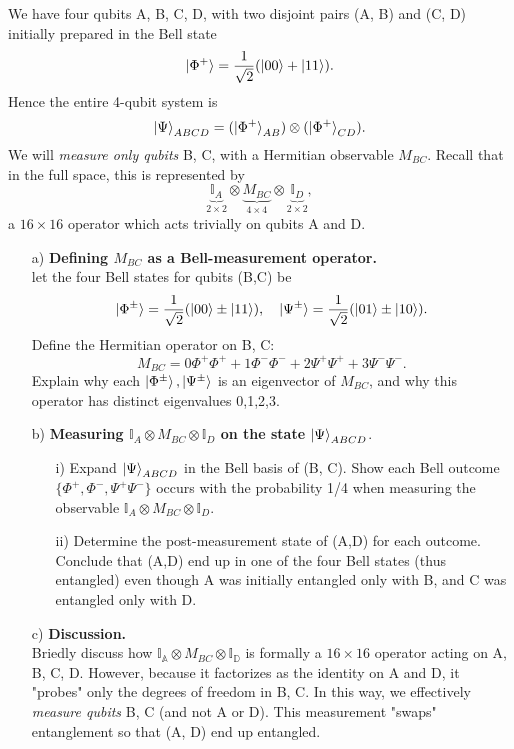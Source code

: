 \documentclass{article}
\begin{document}
\begin{question}
    We have four qubits A, B, C, D, with two disjoint pairs (A, B) and (C, D) initially prepared in the Bell state $$\ket{\Phi^+}=\frac{1}{\sqrt{2}}(\ket{00}+\ket{11}).$$ Hence the entire 4-qubit system is $$\ket{\Psi}_{ABCD}=(\ket{\Phi^+}_{AB})\otimes(\ket{\Phi^+}_{CD}).$$ We will \textit{measure only qubits} B, C, with a Hermitian observable $M_{BC}$. Recall that in the full space, this is represented by $$\underbrace{\mathbb{I}_A}_{2\times 2} \otimes \underbrace{M_{BC}}_{4\times 4} \otimes \underbrace{\mathbb{I}_D}_{2\times 2},$$ a $16\times 16$ operator which acts trivially on qubits A and D.
    \begin{enumerate}
        \item[a)]\textbf{Defining $M_{BC}$ as a Bell-measurement operator.}\\
        let the four Bell states for qubits (B,C) be $$\ket{\Phi^\pm}=\frac{1}{\sqrt{2}}(\ket{00}\pm\ket{11}), \quad \ket{\Psi^\pm}=\frac{1}{\sqrt{2}}(\ket{01}\pm\ket{10}).$$ Define the Hermitian operator on B, C: $$M_{BC}=0\Phi^+\Phi^++1\Phi^-\Phi^-+2\Psi^+\Psi^++3\Psi^-\Psi^-.$$ Explain why each $\ket{\Phi^\pm},\ket{\Psi^\pm}$ is an eigenvector of $M_{BC}$, and why this operator has distinct eigenvalues 0,1,2,3.
        \item[b)]\textbf{Measuring $\mathbb{I}_A \otimes M_{BC} \otimes \mathbb{I}_D$ on the state $\ket{\Psi}_{ABCD}$}.
        \begin{enumerate}
            \item[i)] Expand $\ket{\Psi}_{ABCD}$ in the Bell basis of (B, C). Show each Bell outcome $\{\Phi^+,\Phi^-,\Psi^+\Psi^-\}$ occurs with the probability 1/4 when measuring the observable $\mathbb{I}_A \otimes M_{BC} \otimes \mathbb{I}_D$.
            \item[ii)] Determine the post-measurement state of (A,D) for each outcome. Conclude that (A,D) end up in one of the four Bell states (thus entangled) even though A was initially entangled only with B, and C was entangled only with D.
        \end{enumerate}
        \item[c)]\textbf{Discussion.}\\
        Briedly discuss how $\mathbb{I_A}\otimes M_{BC} \otimes \mathbb{I_D}$ is formally a $16\times16$ operator acting on A, B, C, D. However, because it factorizes as the identity on A and D, it "probes" only the degrees of freedom in B, C. In this way, we effectively \textit{measure qubits} B, C (and not A or D). This measurement "swaps" entanglement so that (A, D) end up entangled.
    \end{enumerate}
\end{question}
\end{document}
